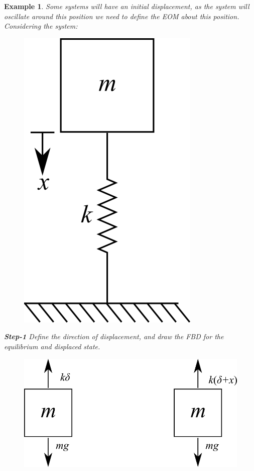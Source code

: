 \documentclass[12pt,letter]{article}
\newtheorem{ex}{Example}
\numberwithin{ex}{section} %
\newenvironment{example}{\begin{mdframed}[middlelinewidth=0.5mm]\begin{ex}\normalfont}{\end{ex}\end{mdframed}}
\numberwithin{re}{section} %
\begin{document}
		\begin{example}	
			Some systems will have an initial displacement, as the system will oscillate around this position we need to define the EOM about this position. Considering the system:
			\begin{figure}[H]
				\centering
				\includegraphics[]{../figures/1-DOF-mass_vertical.png}
			\end{figure}		
			\noindent \textbf{Step-1}
			Define the direction of displacement, and draw the FBD for the equilibrium and displaced state.  
			\begin{figure}[H]
				\centering
				\includegraphics[]{../figures/1-DOF-mass_vertical_FBD.png}\\

\end{figure}
\end{example}
\end{document}
